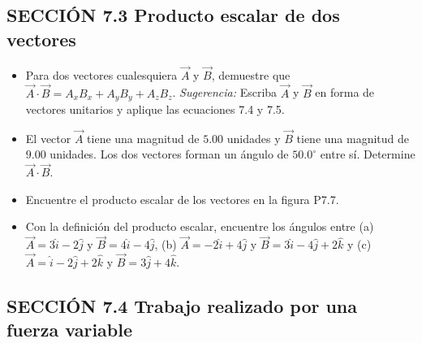 \documentclass[11pt,a4paper]{article}
\begin{document}
\newpage

\subsection*{SECCIÓN 7.3 Producto escalar de dos vectores}

\begin{itemize}
    \item[\textbf{5.}] Para dos vectores cualesquiera $\vec{A}$ y $\vec{B}$, demuestre que $\vec{A} \cdot \vec{B} = A_x B_x + A_y B_y + A_z B_z$. \textit{Sugerencia:} Escriba $\vec{A}$ y $\vec{B}$ en forma de vectores unitarios y aplique las ecuaciones 7.4 y 7.5.
    \vspace*{6cm}

    \item[\textbf{6.}] El vector $\vec{A}$ tiene una magnitud de $5.00$ unidades y $\vec{B}$ tiene una magnitud de $9.00$ unidades. Los dos vectores forman un ángulo de $50.0^\circ$ entre sí. Determine $\vec{A} \cdot \vec{B}$.
    \vspace*{6cm}

    \item[\textbf{7.}] Encuentre el producto escalar de los vectores en la figura P7.7.
    \vspace*{6cm}

    \item[\textbf{8.}] Con la definición del producto escalar, encuentre los ángulos entre (a) $\vec{A} = 3\hat{i} - 2\hat{j}$ y $\vec{B} = 4\hat{i} - 4\hat{j}$, (b) $\vec{A} = -2\hat{i} + 4\hat{j}$ y $\vec{B} = 3\hat{i} - 4\hat{j} + 2\hat{k}$ y (c) $\vec{A} = \hat{i} - 2\hat{j} + 2\hat{k}$ y $\vec{B} = 3\hat{j} + 4\hat{k}$.
    \vspace*{6cm}
\end{itemize}

\newpage

\subsection*{SECCIÓN 7.4 Trabajo realizado por una fuerza variable}
\end{document}
